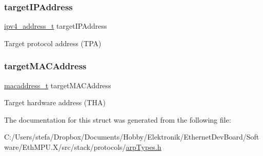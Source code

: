 \subsubsection{\texorpdfstring{targetIPAddress}{targetIPAddress}}
{\footnotesize\ttfamily \mbox{\hyperlink{group__ipv4_gad9df0882950e70d0587a4b423beb261a}{ipv4\+\_\+address\+\_\+t}} target\+I\+P\+Address}



Target protocol address (T\+PA) 

\mbox{\label{struct_a_r_p__message__t_a07b2e71c5ec73e1d4828fd350bd4f041}} 
\subsubsection{\texorpdfstring{targetMACAddress}{targetMACAddress}}
{\footnotesize\ttfamily \mbox{\hyperlink{group__ethernet_gacb865bcbf50a6c8cef05581bfabff373}{macaddress\+\_\+t}} target\+M\+A\+C\+Address}



Target hardware address (T\+HA) 



The documentation for this struct was generated from the following file\+:\begin{DoxyCompactItemize}
\item 
C\+:/\+Users/stefa/\+Dropbox/\+Documents/\+Hobby/\+Elektronik/\+Ethernet\+Dev\+Board/\+Software/\+Eth\+M\+P\+U.\+X/src/stack/protocols/\mbox{\hyperlink{arp_types_8h}{arp\+Types.\+h}}\end{DoxyCompactItemize}
